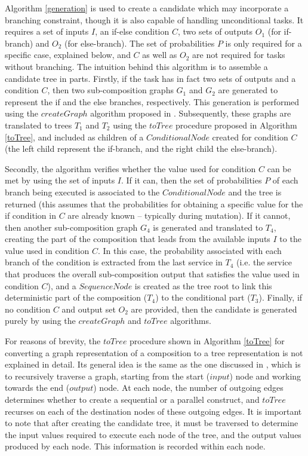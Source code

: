 \documentclass[conference]{IEEEtran}
\begin{document}
Algorithm \ref{generation} is used to create a candidate which may incorporate a branching constraint, though it is also capable of handling unconditional tasks. It requires a
set of inputs $I$, an if-else condition $C$, two sets of outputs $O_1$ (for if-branch) and $O_2$ (for else-branch). The set of probabilities $P$ is only required for a specific case, explained below, and $C$ as well as $O_2$ are not required for tasks without branching. The intuition behind this algorithm is to assemble a candidate tree in parts. Firstly, if the task has in fact two sets of outputs and a condition $C$, then two sub-composition graphs $G_1$ and $G_2$ are generated to represent the if and the else branches, respectively. This generation is performed using the $createGraph$ algorithm proposed in \cite{wang2013genetic}. Subsequently, these graphs are translated to trees $T_1$ and $T_2$ using the $toTree$ procedure proposed in Algorithm \ref{toTree}, and included as children of a $ConditionalNode$ created for condition $C$ (the left child represent the if-branch, and the right child the else-branch).

Secondly, the algorithm verifies whether the value used for condition $C$ can be met by using the set of inputs $I$. If it can, then the set of probabilities $P$ of each branch being executed is associated to the $ConditionalNode$ and the tree is returned (this assumes that the probabilities for obtaining a specific value for the if condition in $C$ are already known -- typically during mutation). If it cannot, then another sub-composition graph $G_4$ is generated and translated to $T_4$, creating the part of the composition that leads from the available inputs $I$ to the value used in condition $C$. In this case, the probability associated with each branch of the condition is extracted from the last service in $T_4$ (i.e. the service that produces the overall sub-composition output that satisfies the value used in condition $C$), and a $SequenceNode$ is created as the tree root to link this deterministic part of the composition ($T_4$) to the conditional part ($T_3$). Finally, if no condition $C$ and output set $O_2$ are provided, then the candidate is generated purely by using the $createGraph$ and $toTree$ algorithms. 

For reasons of brevity, the $toTree$ procedure shown in Algorithm \ref{toTree} for converting a graph representation of a composition to a tree representation is not explained in detail. Its general idea is the same as the one discussed in \cite{nguyen2005text}, which is to recursively traverse a graph, starting from the start ($input$) node and working towards the end ($output$) node. At each node, the number of outgoing edges determines whether to create a sequential or a parallel construct, and $toTree$ recurses on each of the destination nodes of these outgoing edges. It is important to note that after creating the candidate tree, it must be traversed to determine the input values required to execute each node of the tree, and the output values produced by each node. This information is recorded within each node.
\end{document}

